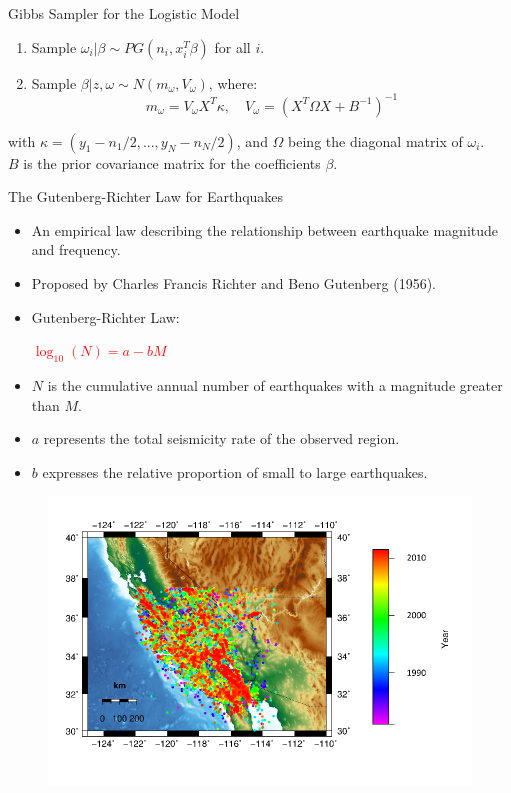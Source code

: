 \documentclass{beamer}
\begin{document}
	\begin{frame}{Gibbs Sampler for the Logistic Model}
		\begin{enumerate}
			\item Sample $\omega_i | \beta \sim PG(n_i, x_i^T \beta)$ for all $i$.
			\item Sample $\beta | z, \omega \sim N(m_{\omega}, V_{\omega})$, where:
			\begin{equation}
				m_{\omega} = V_{\omega} X^T \kappa, \quad V_{\omega} = (X^T \Omega X + B^{-1})^{-1}
			\end{equation}
		\end{enumerate}
		with $\kappa = (y_1 - n_1/2, ..., y_N - n_N/2)$, and $\Omega$ being the diagonal matrix of $\omega_i$. \\ 
		$B$ is the prior covariance matrix for the coefficients $\beta$.
	\end{frame}
	
	\begin{frame}{The Gutenberg-Richter Law for Earthquakes}
		\begin{itemize}
			\item An empirical law describing the relationship between earthquake magnitude and frequency.
			\item Proposed by Charles Francis Richter and Beno Gutenberg (1956).
			\item Gutenberg-Richter Law:
			\begin{center}
				\textcolor{red}{$ \log_{10}(N) = a - bM $}
			\end{center}
			\item $N$ is the cumulative annual number of earthquakes with a magnitude greater than $M$.
			\item $a$ represents the total seismicity rate of the observed region.
			\item $b$ expresses the relative proportion of small to large earthquakes.
		\end{itemize}
	\end{frame}
	
	
	\begin{frame}
		\begin{figure}
			\centering
			\includegraphics[width=0.95\linewidth]{erdbeben1}
			\label{fig:earthquake1}
		\end{figure}
	\end{frame}
	
\end{document}
